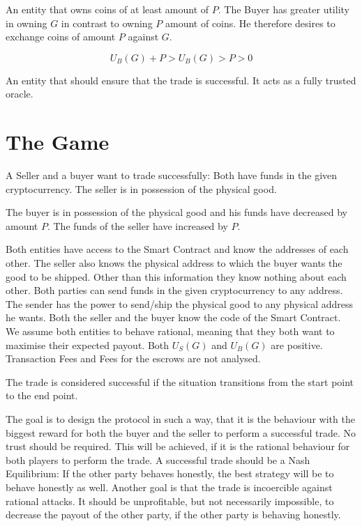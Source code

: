\documentclass{cacthesis}
\begin{document}
An entity that owns coins of at least amount of $P$. The Buyer has greater utility in owning $G$ in contrast to  owning $P$ amount of coins. He therefore desires to exchange coins of amount $P$ against $G$.

\begin{equation}
    U_B(G) + P > U_B(G) > P > 0
\end{equation}

 An entity that should ensure that the trade is successful. It acts as a fully trusted oracle.

\section{The Game}

A Seller and a buyer want to trade successfully: Both have funds in the given cryptocurrency. The seller is in possession of the physical good.

The buyer is in possession of the physical good and his funds have decreased by amount $P$. The funds of the seller have increased by $P$.

Both entities have access to the Smart Contract and know the addresses of each other. The seller also knows the physical address to which the buyer wants the good to be shipped. Other than this information they know nothing about each other.\newline 
Both parties can send funds in the given cryptocurrency to any address. The sender has the power to send/ship the physical good to any physical address he wants. Both the seller and the buyer know the code of the Smart Contract.\newline
We assume both entities to behave rational, meaning that they both want to maximise their expected payout.\newline
Both $U_S(G)$ and $U_B(G)$ are positive. \newline
Transaction Fees and Fees for the escrows are not analysed.



The trade is considered successful if the situation transitions from the start point to the end point.

The goal is to design the protocol in such a way, that it is the behaviour with the biggest reward for both the buyer and the seller to perform a successful trade.\newline
No trust should be required. This will be achieved, if it is the rational behaviour for both players to perform the trade. A successful trade should be a Nash Equilibrium: If the other party behaves honestly, the best strategy will be to behave honestly as well.\newline
Another goal is that the trade is incoercible against rational attacks. It should be unprofitable, but not necessarily impossible, to decrease the payout of the other party, if the other party is behaving honestly. 
\end{document}
